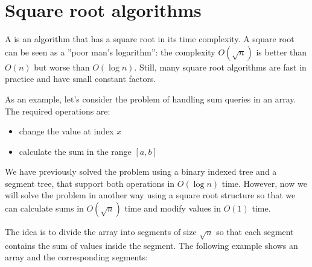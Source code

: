 \chapter{Square root algorithms}


A  is an algorithm
that has a square root in its time complexity.
A square root can be seen as a ''poor man's logarithm'':
the complexity $O(\sqrt n)$ is better than $O(n)$
but worse than $O(\log n)$.
Still, many square root algorithms are fast in practice
and have small constant factors.

As an example, let's consider the problem of
handling sum queries in an array.
The required operations are:

\begin{itemize}
\item change the value at index $x$
\item calculate the sum in the range $[a,b]$
\end{itemize}

We have previously solved the problem using
a binary indexed tree and a segment tree,
that support both operations in $O(\log n)$ time.
However, now we will solve the problem
in another way using a square root structure
so that we can calculate sums in $O(\sqrt n)$ time
and modify values in $O(1)$ time.

The idea is to divide the array into segments
of size $\sqrt n$ so that each segment contains
the sum of values inside the segment.
The following example shows an array and the
corresponding segments:

\begin{center}
\end{center}

